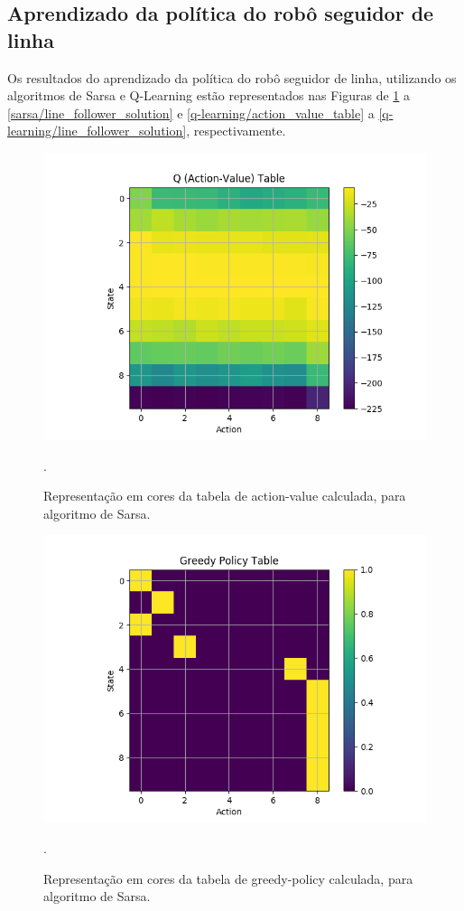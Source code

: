\documentclass[conference]{IEEEtran}
\begin{document}
\subsection{Aprendizado da política do robô seguidor de linha}

Os resultados do aprendizado da política do robô seguidor de linha, utilizando os algoritmos de Sarsa e Q-Learning estão representados nas Figuras de \ref{sarsa/action_value_table} a \ref{sarsa/line_follower_solution} e \ref{q-learning/action_value_table} a \ref{q-learning/line_follower_solution}, respectivamente. 

\begin{figure}[htbp]
\centering
\centerline{\includegraphics[scale=0.5]{imagens/sarsa/action_value_table.png}}
\caption{Representação em cores da tabela de action-value calculada, para algoritmo de Sarsa.}.
\label{sarsa/action_value_table}
\end{figure}

\begin{figure}[htbp]
\centering
\centerline{\includegraphics[scale=0.5]{imagens/sarsa/greedy_policy_table.png}}
\caption{Representação em cores da tabela de greedy-policy calculada, para algoritmo de Sarsa.}.
\label{sarsa/greedy_policy_table}
\end{figure} 
\end{document}
